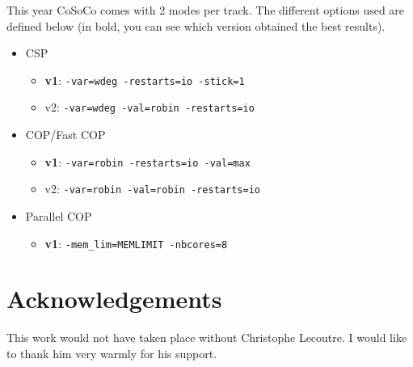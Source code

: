 \documentclass{llncs}
\begin{document}
    \medskip
    This year CoSoCo comes with 2 modes per track. The different options used are defined below (in bold, you can see which version obtained the best results).

    \begin{itemize}
        \item     CSP
        \begin{itemize}
            \item   {\bf v1}: {\tt -var=wdeg -restarts=io -stick=1}
            \item v2: {\tt -var=wdeg -val=robin -restarts=io}
        \end{itemize}
        \item COP/Fast COP
        \begin{itemize}
            \item {\bf v1}: {\tt -var=robin -restarts=io -val=max}
            \item v2: {\tt -var=robin -val=robin -restarts=io}
        \end{itemize}
        \item Parallel COP
        \begin{itemize}
            \item {\bf v1}: {\tt  -mem\_lim=MEMLIMIT -nbcores=8}
        \end{itemize}
    \end{itemize}





    \section*{Acknowledgements}
    This work would not have taken place without Christophe Lecoutre. I would like to thank him very warmly for his support.

    
    
\end{document}
